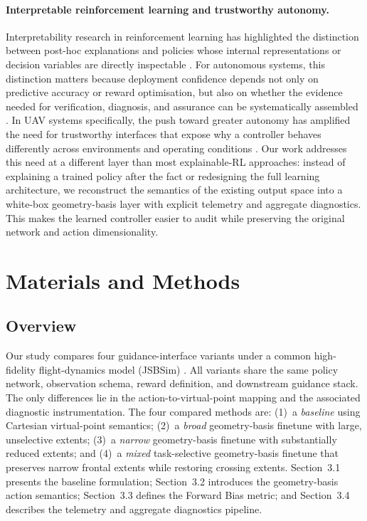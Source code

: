 \documentclass[drones,article,submit,pdftex,moreauthors]{Definitions/mdpi}
\begin{document}
\paragraph{Interpretable reinforcement learning and trustworthy autonomy.}
Interpretability research in reinforcement learning has highlighted the distinction between post-hoc explanations and policies whose internal representations or decision variables are directly inspectable \cite{glanois2024,paleja2022}. For autonomous systems, this distinction matters because deployment confidence depends not only on predictive accuracy or reward optimisation, but also on whether the evidence needed for verification, diagnosis, and assurance can be systematically assembled \cite{paterson2025,gunning2019}. In UAV systems specifically, the push toward greater autonomy has amplified the need for trustworthy interfaces that expose why a controller behaves differently across environments and operating conditions \cite{elmokadem2021,thomas2021}. Our work addresses this need at a different layer than most explainable-RL approaches: instead of explaining a trained policy after the fact or redesigning the full learning architecture, we reconstruct the semantics of the existing output space into a white-box geometry-basis layer with explicit telemetry and aggregate diagnostics. This makes the learned controller easier to audit while preserving the original network and action dimensionality.

\section{Materials and Methods}

\subsection{Overview}

Our study compares four guidance-interface variants under a common high-fidelity flight-dynamics model (JSBSim) \cite{lai2026aerospace}. All variants share the same policy network, observation schema, reward definition, and downstream guidance stack. The only differences lie in the action-to-virtual-point mapping and the associated diagnostic instrumentation. The four compared methods are: (1)~a \emph{baseline} using Cartesian virtual-point semantics; (2)~a \emph{broad} geometry-basis finetune with large, unselective extents; (3)~a \emph{narrow} geometry-basis finetune with substantially reduced extents; and (4)~a \emph{mixed} task-selective geometry-basis finetune that preserves narrow frontal extents while restoring crossing extents. Section~3.1 presents the baseline formulation; Section~3.2 introduces the geometry-basis action semantics; Section~3.3 defines the Forward Bias metric; and Section~3.4 describes the telemetry and aggregate diagnostics pipeline.
\end{document}
